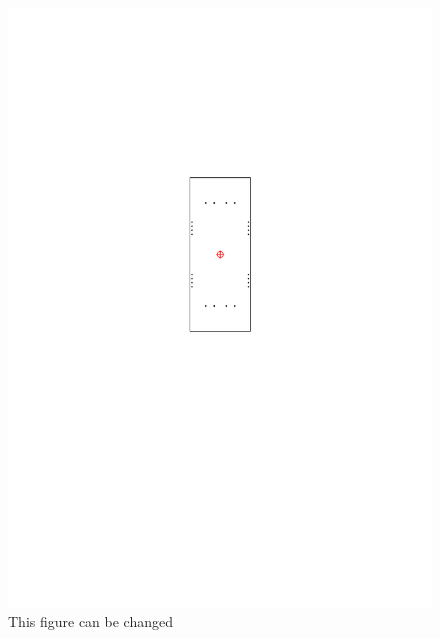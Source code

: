 \documentclass[12pt,a4paper]{article} %
\begin{document}
\begin{figure}[h]
    \centering
    \includegraphics[width=\textwidth]{../../2-Calculation_Output/Temporal_Images/fi_s004.pdf}
    \caption{This figure can be changed}
\end{figure}





\end{document}
